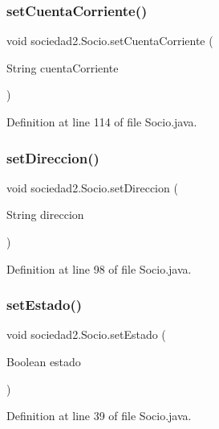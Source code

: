 \subsubsection{\texorpdfstring{set\+Cuenta\+Corriente()}{setCuentaCorriente()}}
{\footnotesize\ttfamily void sociedad2.\+Socio.\+set\+Cuenta\+Corriente (\begin{DoxyParamCaption}\item[{String}]{cuenta\+Corriente }\end{DoxyParamCaption})}



Definition at line 114 of file Socio.\+java.

\mbox{\label{classsociedad2_1_1_socio_a89eac57c5634e388f0bcf81301f230b7}} 
\subsubsection{\texorpdfstring{set\+Direccion()}{setDireccion()}}
{\footnotesize\ttfamily void sociedad2.\+Socio.\+set\+Direccion (\begin{DoxyParamCaption}\item[{String}]{direccion }\end{DoxyParamCaption})}



Definition at line 98 of file Socio.\+java.

\mbox{\label{classsociedad2_1_1_socio_aacec5199da027c329fbb1836e524c0fa}} 
\subsubsection{\texorpdfstring{set\+Estado()}{setEstado()}}
{\footnotesize\ttfamily void sociedad2.\+Socio.\+set\+Estado (\begin{DoxyParamCaption}\item[{Boolean}]{estado }\end{DoxyParamCaption})}



Definition at line 39 of file Socio.\+java.

